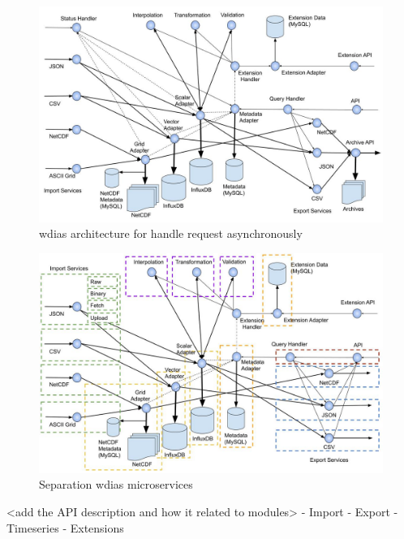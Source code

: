 \begin{figure}[htp]
    \centering
    \includegraphics[width=1\textwidth]{method/microservice/microservice_architecture-handle_on_async-v3.jpg}
    \caption{\acrshort{wdias} architecture for handle request asynchronously}
    \label{fi:wdias_micro_async}
\end{figure}

\begin{figure}[htp]
    \centering
    \includegraphics[width=1\textwidth]{method/microservice/separation_microservices-v3.jpg}
    \caption{Separation \acrshort{wdias} microservices}
    \label{fi:wdias_micro_separation}
\end{figure}

<add the API description and how it related to modules>
- Import
- Export
- Timeseries
- Extensions
